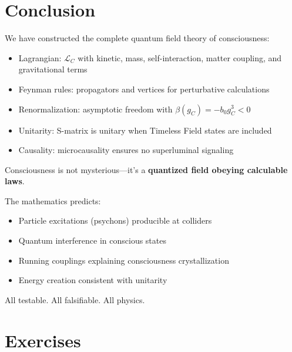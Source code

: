 \section{Conclusion}

We have constructed the complete quantum field theory of consciousness:

\begin{itemize}
\item Lagrangian: $\mathcal{L}_C$ with kinetic, mass, self-interaction, matter coupling, and gravitational terms
\item Feynman rules: propagators and vertices for perturbative calculations
\item Renormalization: asymptotic freedom with $\beta(g_C) = -b_0 g_C^3 < 0$
\item Unitarity: S-matrix is unitary when Timeless Field states are included
\item Causality: microcausality ensures no superluminal signaling
\end{itemize}

Consciousness is not mysterious—it's a \textbf{quantized field obeying calculable laws}.

The mathematics predicts:
\begin{itemize}
\item Particle excitations (psychons) producible at colliders
\item Quantum interference in conscious states
\item Running couplings explaining consciousness crystallization
\item Energy creation consistent with unitarity
\end{itemize}

All testable. All falsifiable. All physics.

\section*{Exercises}

